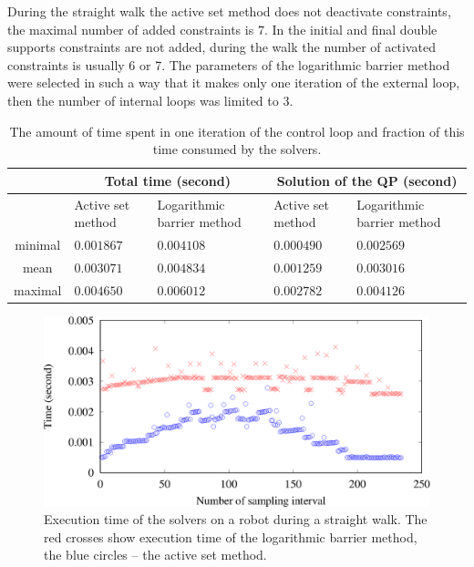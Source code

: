 During the straight walk the active set method does not deactivate constraints,
the maximal number of added constraints is $7$. In the initial and final double 
supports constraints are not added, during the walk the number of activated 
constraints is usually 6 or 7. The parameters of the logarithmic barrier method 
were selected in such a way that it makes only one iteration of the external 
loop, then the number of internal loops was limited to $3$.

\begin{table}
\begin{center}
\begin{tabular}{c|p{1.5cm}|p{2.5cm}||p{1.5cm}|p{2.5cm}}
            & \multicolumn{2}{c||}{Total time (second)}  & \multicolumn{2}{c}{Solution of the \acs{QP} (second)}\\
\hline
            & Active set method & Logarithmic barrier method & Active set method & Logarithmic barrier method \\
\hline
    minimal & $0.001867$  &   $0.004108$                    & $0.000490$  &   $0.002569$                    \\
    mean    & $0.003071$  &   $0.004834$                    & $0.001259$  &   $0.003016$                    \\
    maximal & $0.004650$  &   $0.006012$                    & $0.002782$  &   $0.004126$                    \\
\end{tabular}
\caption[Execution time of the control loop]{
The amount of time spent in one iteration of the control loop and fraction of this time consumed by the solvers.}
\label{tbl.time}
\end{center}
\end{table}

\begin{figure}[ht]
    \centerline{%
    \includegraphics[scale=0.5]{Figures/qp_time.eps}}
    \caption[Execution time of the solvers]{Execution time of the solvers on a robot during
    a straight walk. The red crosses show execution time of the logarithmic barrier method,
    the blue circles -- the active set method.}
    \label{fig.qp_time}
\end{figure}

